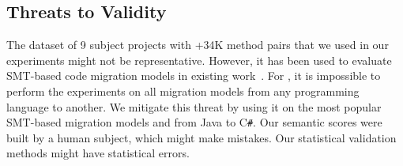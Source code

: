 \subsection{Threats to Validity}

The dataset of 9 subject projects with +34K method pairs that we used
in our experiments might not be representative. However, it has been
used to evaluate SMT-based code migration models in existing
work~\cite{fse13,ase15,icsme16}. For {\model}, it is impossible to
perform the experiments on all migration models from any programming
language to another. We mitigate this threat by using it on the most
popular SMT-based migration models and from Java to C\texttt{\#}. Our
semantic scores were built by a human subject, which might make
mistakes. Our statistical validation methods might have statistical
errors.

